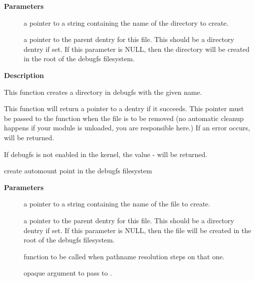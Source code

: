 \documentclass[a4paper,8pt,english]{sphinxmanual}
\begin{document}
\textbf{Parameters}
\begin{description}
\item[{}] \leavevmode
a pointer to a string containing the name of the directory to
create.

\item[{}] \leavevmode
a pointer to the parent dentry for this file.  This should be a
directory dentry if set.  If this parameter is NULL, then the
directory will be created in the root of the debugfs filesystem.

\end{description}

\textbf{Description}

This function creates a directory in debugfs with the given name.

This function will return a pointer to a dentry if it succeeds.  This
pointer must be passed to the {\hyperref[filesystems/index:c.debugfs_remove]{\emph{}}} function when the file is
to be removed (no automatic cleanup happens if your module is unloaded,
you are responsible here.)  If an error occurs,  will be returned.

If debugfs is not enabled in the kernel, the value - will be
returned.

\begin{fulllineitems}
\label{filesystems/index:c.debugfs_create_automount}
create automount point in the debugfs filesystem

\end{fulllineitems}


\textbf{Parameters}
\begin{description}
\item[{}] \leavevmode
a pointer to a string containing the name of the file to create.

\item[{}] \leavevmode
a pointer to the parent dentry for this file.  This should be a
directory dentry if set.  If this parameter is NULL, then the
file will be created in the root of the debugfs filesystem.

\item[{}] \leavevmode
function to be called when pathname resolution steps on that one.

\item[{}] \leavevmode
opaque argument to pass to .

\end{description}
\end{document}
